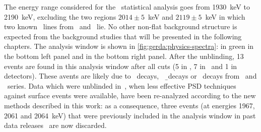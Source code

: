 The energy range considered for the \onbb\ statistical analysis goes from 1930~keV to
2190~keV, excluding the two regions $2014 \pm 5$~keV and $2119 \pm 5$~keV in which two
known \g\ lines from \Bih\ and \Tl\ lie. No other non-flat background structure is
expected from the background studies that will be presented in the following chapters.
The analysis window is shown in \cref{fig:gerda:physics-spectra}: in green in the bottom
left panel and in the bottom right panel. After the unblinding, 13 events are found in
this analysis window after all cuts (5 in \scoax, 7 in \bege\ and 1 in \icoax detectors).
These avents are likely due to \a\ decays, \kvz\ \b\ decays or \g\ decays from \Uh\ and
\Thh\ series. Data which were unblinded in~\cite{Agostini2017}, when less effective PSD
techniques against surface events were available, have been re-analyzed according to the
new methods described in this work: as a consequence, three events (at energies 1967, 2061
and 2064~keV) that were previously included in the analysis window in past data
releases~\cite{Agostini2019a, Agostini2017, Agostini2018} are now discarded.

\begin{sidewaystable}
  \centering
  \caption{%
    Summary of the parameters of interest for \gerdatwo\ for different detector types and
    before/after the upgrade.  The components of the total efficiency $\epsilon$ for
    \onbb\ decays are also reported individually. The efficiency factors due to muon veto
    and quality cuts are above $99.9\%$ and are not shown explicitly.  Energy resolution
    and all \onbb\ decay efficiencies are reported as exposure-weighted average for each
    detector type and their uncertainties are given as standard deviation.
  }\label{tab:gerda:efficiencies}
  
\end{sidewaystable}


